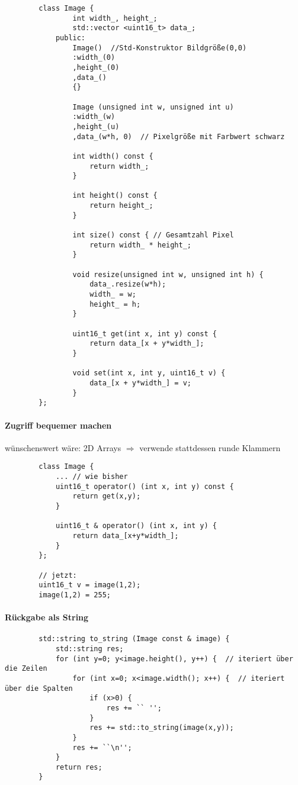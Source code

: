 \documentclass{article}
\begin{document}

	\begin{lstlisting}
		class Image {
				int width_, height_;
				std::vector <uint16_t> data_;
			public:
				Image()  //Std-Konstruktor Bildgröße(0,0)
				:width_(0) 
				,height_(0)
				,data_()
				{}

				Image (unsigned int w, unsigned int u) 
				:width_(w)
				,height_(u)
				,data_(w*h, 0)  // Pixelgröße mit Farbwert schwarz

				int width() const {
					return width_;
				}

				int height() const {
					return height_;
				}

				int size() const { // Gesamtzahl Pixel
					return width_ * height_;
				}

				void resize(unsigned int w, unsigned int h) {
					data_.resize(w*h);
					width_ = w;
					height_ = h;
				}

				uint16_t get(int x, int y) const {
					return data_[x + y*width_];
				}

				void set(int x, int y, uint16_t v) {
					data_[x + y*width_] = v;
				}
		};
	\end{lstlisting}
\paragraph*{Zugriff bequemer machen}
	wünschenswert wäre: 2D Arrays $\Rightarrow $ verwende stattdessen runde Klammern
	\begin{lstlisting}
		class Image {
			... // wie bisher
			uint16_t operator() (int x, int y) const {
				return get(x,y);
			}

			uint16_t & operator() (int x, int y) {
				return data_[x+y*width_];
			}
		};

		// jetzt:
		uint16_t v = image(1,2);
		image(1,2) = 255;
	\end{lstlisting}

\paragraph{Rückgabe als String}
	\begin{lstlisting}
		std::string to_string (Image const & image) {
			std::string res;
			for (int y=0; y<image.height(), y++) {  // iteriert über die Zeilen
				for (int x=0; x<image.width(); x++) {  // iteriert über die Spalten
					if (x>0) {
						res += `` '';
					}
					res += std::to_string(image(x,y));
				}
				res += ``\n'';
			}
			return res;
		}
	\end{lstlisting}
\end{document}
